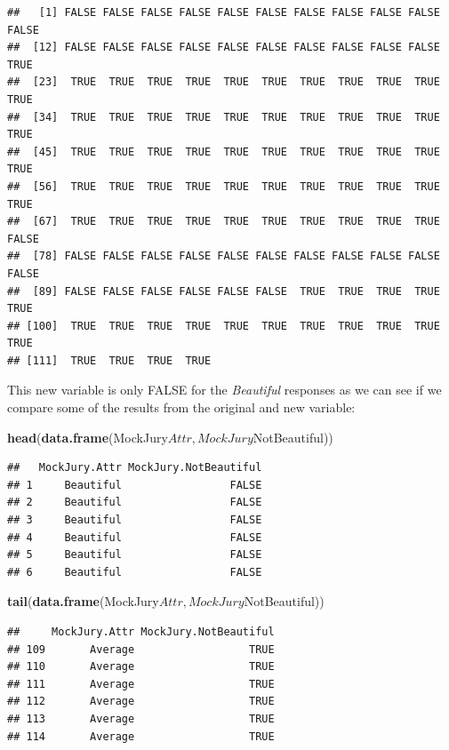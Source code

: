 \documentclass[]{book}
\newenvironment{Shaded}{\begin{snugshade}}{\end{snugshade}}
\newcommand{\KeywordTok}[1]{\textcolor[rgb]{0.13,0.29,0.53}{\textbf{{#1}}}}
\newcommand{\NormalTok}[1]{{#1}}
\begin{document}
\begin{verbatim}
##   [1] FALSE FALSE FALSE FALSE FALSE FALSE FALSE FALSE FALSE FALSE FALSE
##  [12] FALSE FALSE FALSE FALSE FALSE FALSE FALSE FALSE FALSE FALSE  TRUE
##  [23]  TRUE  TRUE  TRUE  TRUE  TRUE  TRUE  TRUE  TRUE  TRUE  TRUE  TRUE
##  [34]  TRUE  TRUE  TRUE  TRUE  TRUE  TRUE  TRUE  TRUE  TRUE  TRUE  TRUE
##  [45]  TRUE  TRUE  TRUE  TRUE  TRUE  TRUE  TRUE  TRUE  TRUE  TRUE  TRUE
##  [56]  TRUE  TRUE  TRUE  TRUE  TRUE  TRUE  TRUE  TRUE  TRUE  TRUE  TRUE
##  [67]  TRUE  TRUE  TRUE  TRUE  TRUE  TRUE  TRUE  TRUE  TRUE  TRUE FALSE
##  [78] FALSE FALSE FALSE FALSE FALSE FALSE FALSE FALSE FALSE FALSE FALSE
##  [89] FALSE FALSE FALSE FALSE FALSE FALSE  TRUE  TRUE  TRUE  TRUE  TRUE
## [100]  TRUE  TRUE  TRUE  TRUE  TRUE  TRUE  TRUE  TRUE  TRUE  TRUE  TRUE
## [111]  TRUE  TRUE  TRUE  TRUE
\end{verbatim}

This new variable is only FALSE for the \emph{Beautiful} responses as we
can see if we compare some of the results from the original and new
variable:

\begin{Shaded}
\begin{Highlighting}[]
\KeywordTok{head}\NormalTok{(}\KeywordTok{data.frame}\NormalTok{(MockJury$Attr, MockJury$NotBeautiful))}
\end{Highlighting}
\end{Shaded}

\begin{verbatim}
##   MockJury.Attr MockJury.NotBeautiful
## 1     Beautiful                 FALSE
## 2     Beautiful                 FALSE
## 3     Beautiful                 FALSE
## 4     Beautiful                 FALSE
## 5     Beautiful                 FALSE
## 6     Beautiful                 FALSE
\end{verbatim}

\begin{Shaded}
\begin{Highlighting}[]
\KeywordTok{tail}\NormalTok{(}\KeywordTok{data.frame}\NormalTok{(MockJury$Attr, MockJury$NotBeautiful))}
\end{Highlighting}
\end{Shaded}

\begin{verbatim}
##     MockJury.Attr MockJury.NotBeautiful
## 109       Average                  TRUE
## 110       Average                  TRUE
## 111       Average                  TRUE
## 112       Average                  TRUE
## 113       Average                  TRUE
## 114       Average                  TRUE
\end{verbatim}
\end{document}
